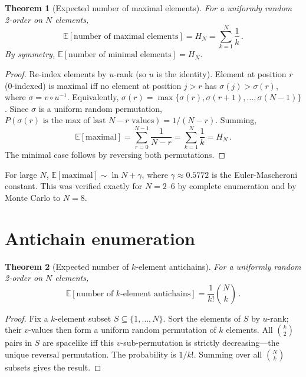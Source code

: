 \documentclass[aps,prd,twocolumn,superscriptaddress,nofootinbib]{revtex4-2}
\newtheorem{theorem}{Theorem}
\begin{document}
\begin{theorem}[Expected number of maximal elements]
\label{thm:maximal}
For a uniformly random 2-order on $N$ elements,
\begin{equation}
\mathbb{E}[\text{number of maximal elements}] = H_N = \sum_{k=1}^{N} \frac{1}{k}\,.
\end{equation}
By symmetry, $\mathbb{E}[\text{number of minimal elements}] = H_N$.
\end{theorem}

\begin{proof}
Re-index elements by $u$-rank (so $u$ is the identity). Element at position $r$ (0-indexed) is maximal iff no element at position $j > r$ has $\sigma(j) > \sigma(r)$, where $\sigma = v \circ u^{-1}$. Equivalently, $\sigma(r) = \max\{\sigma(r), \sigma(r+1), \ldots, \sigma(N-1)\}$. Since $\sigma$ is a uniform random permutation, $P(\sigma(r) \text{ is the max of last } N - r \text{ values}) = 1/(N-r)$. Summing,
\begin{equation}
\mathbb{E}[\text{maximal}] = \sum_{r=0}^{N-1} \frac{1}{N-r} = \sum_{k=1}^{N} \frac{1}{k} = H_N\,.
\end{equation}
The minimal case follows by reversing both permutations.
\end{proof}

For large $N$, $\mathbb{E}[\text{maximal}] \sim \ln N + \gamma$, where $\gamma \approx 0.5772$ is the Euler-Mascheroni constant. This was verified exactly for $N = 2$--$6$ by complete enumeration and by Monte Carlo to $N = 8$.

\section{Antichain enumeration}

\begin{theorem}[Expected number of $k$-element antichains]
\label{thm:k_antichain}
For a uniformly random 2-order on $N$ elements,
\begin{equation}
\mathbb{E}[\text{number of $k$-element antichains}] = \frac{1}{k!}\binom{N}{k}\,.
\end{equation}
\end{theorem}

\begin{proof}
Fix a $k$-element subset $S \subseteq \{1, \ldots, N\}$. Sort the elements of $S$ by $u$-rank; their $v$-values then form a uniform random permutation of $k$ elements. All $\binom{k}{2}$ pairs in $S$ are spacelike iff this $v$-sub-permutation is strictly decreasing---the unique reversal permutation. The probability is $1/k!$. Summing over all $\binom{N}{k}$ subsets gives the result.
\end{proof}
\end{document}
